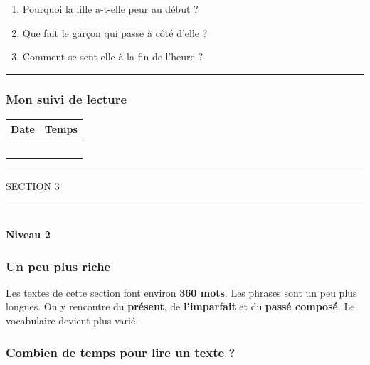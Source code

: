 \documentclass[
  french,
  14pt,
  a4paper,
]{extarticle}
\providecommand{\tightlist}{%
  \setlength{\itemsep}{0pt}\setlength{\parskip}{0pt}}
\newcommand{\sectiondivider}[2]{%
  \vspace*{2cm}%
  \begin{center}
    {\fontsize{18pt}{22pt}\selectfont\textcolor{accentcolor}{\MakeUppercase{Section #1}}}\\[0.6em]
    \textcolor{accentcolor}{\rule{0.35\textwidth}{1.5pt}}\\[1em]
    {\fontsize{38pt}{44pt}\selectfont\bfseries #2}
  \end{center}
  \vspace{1.5cm}
}
\begin{document}
\begin{enumerate}
\def\labelenumi{\arabic{enumi}.}
\tightlist
\item
  Pourquoi la fille a-t-elle peur au début ?
\item
  Que fait le garçon qui passe à côté d'elle ?
\item
  Comment se sent-elle à la fin de l'heure ?
\end{enumerate}

\begin{center}\rule{0.5\linewidth}{0.5pt}\end{center}

\subsubsection{Mon suivi de lecture}\label{mon-suivi-de-lecture-7}

\begin{center}
\begin{tabularx}{0.75\textwidth}{|X|X|}
\hline
\textbf{Date} & \textbf{Temps} \\
\hline
& \\
\hline
& \\
\hline
& \\
\hline
& \\
\hline
& \\
\hline
\end{tabularx}
\end{center}

\begin{center}\rule{0.5\linewidth}{0.5pt}\end{center}

\newpage

\sectiondivider{3}{Niveau 2}

\subsubsection{Un peu plus riche}\label{un-peu-plus-riche}

Les textes de cette section font environ \textbf{360 mots}. Les phrases
sont un peu plus longues. On y rencontre du \textbf{présent}, de
\textbf{l'imparfait} et du \textbf{passé composé}. Le vocabulaire
devient plus varié.

\subsubsection{Combien de temps pour lire un texte
?}\label{combien-de-temps-pour-lire-un-texte-2}
\end{document}
